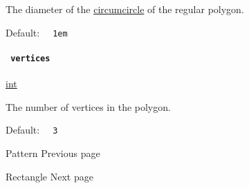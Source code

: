 The diameter of the
\href{https://en.wikipedia.org/wiki/Circumcircle}{circumcircle} of the
regular polygon.

Default: \texttt{\ }{\texttt{\ 1em\ }}\texttt{\ }

\paragraph{\texorpdfstring{\texttt{\ vertices\ }}{ vertices }}\label{definitions-regular-vertices}

\href{/docs/reference/foundations/int/}{int}

The number of vertices in the polygon.

Default: \texttt{\ }{\texttt{\ 3\ }}\texttt{\ }

\href{/docs/reference/visualize/pattern/}{\pandocbounded{}}

{ Pattern } { Previous page }

\href{/docs/reference/visualize/rect/}{\pandocbounded{}}

{ Rectangle } { Next page }
